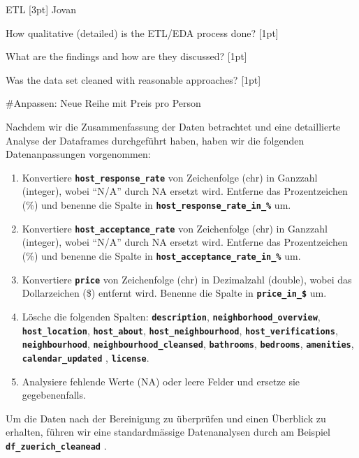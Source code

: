 \documentclass[
  journal,
]{IEEEtran}%
\begin{document}
ETL {[}3pt{]} Jovan

How qualitative (detailed) is the ETL/EDA process done? {[}1pt{]}

What are the findings and how are they discussed? {[}1pt{]}

Was the data set cleaned with reasonable approaches? {[}1pt{]}

\#Anpassen: Neue Reihe mit Preis pro Person

Nachdem wir die Zusammenfassung der Daten betrachtet und eine
detaillierte Analyse der Dataframes durchgeführt haben, haben wir die
folgenden Datenanpassungen vorgenommen:

\begin{enumerate}
\def\labelenumi{\arabic{enumi}.}
\item
  Konvertiere \textbf{\texttt{host\_response\_rate}} von Zeichenfolge
  (chr) in Ganzzahl (integer), wobei ``N/A'' durch NA ersetzt wird.
  Entferne das Prozentzeichen (\%) und benenne die Spalte in
  \textbf{\texttt{host\_response\_rate\_in\_\%}} um.
\item
  Konvertiere \textbf{\texttt{host\_acceptance\_rate}} von Zeichenfolge
  (chr) in Ganzzahl (integer), wobei ``N/A'' durch NA ersetzt wird.
  Entferne das Prozentzeichen (\%) und benenne die Spalte in
  \textbf{\texttt{host\_acceptance\_rate\_in\_\%}} um.
\item
  Konvertiere \textbf{\texttt{price}} von Zeichenfolge (chr) in
  Dezimalzahl (double), wobei das Dollarzeichen (\$) entfernt wird.
  Benenne die Spalte in \textbf{\texttt{price\_in\_\$}} um.
\item
  Lösche die folgenden Spalten: \textbf{\texttt{description}},
  \textbf{\texttt{neighborhood\_overview}},
  \textbf{\texttt{host\_location}}, \textbf{\texttt{host\_about}},
  \textbf{\texttt{host\_neighbourhood}},
  \textbf{\texttt{host\_verifications}},
  \textbf{\texttt{neighbourhood}},
  \textbf{\texttt{neighbourhood\_cleansed}},
  \textbf{\texttt{bathrooms}}, \textbf{\texttt{bedrooms}},
  \textbf{\texttt{amenities}}, \textbf{\texttt{calendar\_updated}} ,
  \textbf{\texttt{license}}.
\item
  Analysiere fehlende Werte (NA) oder leere Felder und ersetze sie
  gegebenenfalls.
\end{enumerate}

Um die Daten nach der Bereinigung zu überprüfen und einen Überblick zu
erhalten, führen wir eine standardmässige Datenanalysen durch am
Beispiel \textbf{\texttt{df\_zuerich\_cleanead}} .
\end{document}
